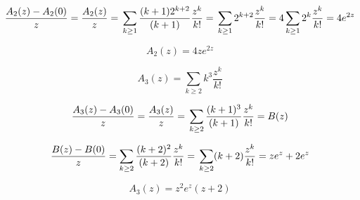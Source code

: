\documentclass[12pt]{article}
\begin{document}
\begin{equation}
\frac{A_2(z) - A_2(0)}{z} = \frac{A_2(z)}{z} = \\
\sum_{k \geq 1}\frac{(k+1)2^{k+2}}{(k+1)}\frac{z^k}{k!} = \\
\sum_{k \geq 1}2^{k+2}\frac{z^k}{k!} = \\
4\sum_{k \geq 1}2^k\frac{z^k}{k!} = 4e^{2z}\nonumber
\end{equation}

\begin{equation}
A_2(z) = 4ze^{2z} \nonumber
\end{equation}

\begin{equation}
A_3(z) = \sum_{k \geq 2} k^3 \frac{z^k}{k!} \nonumber
\end{equation}

\begin{equation}
\frac{A_3(z) - A_3(0)}{z} = \frac{A_3(z)}{z} = \\
\sum_{k \geq 2} \frac{(k+1)^3}{(k+1)} \frac{z^k}{k!} = B(z) \nonumber
\end{equation}

\begin{equation}
\frac{B(z) - B(0)}{z} = \sum_{k \geq 2}\frac{(k+2)^2}{(k+2)}\frac{z^k}{k!} =\\
\sum_{k \geq 2}(k + 2)\frac{z^k}{k!} = ze^z + 2e^z \nonumber
\end{equation}

\begin{equation}
A_3(z) = z^2e^z(z + 2) \nonumber
\end{equation}
\end{document}
